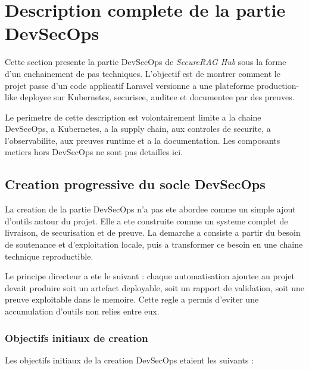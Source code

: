 % 
%

\section{Description complete de la partie DevSecOps}
\label{sec:devsecops-diagrammes-pas-a-pas}

Cette section presente la partie DevSecOps de \textit{SecureRAG Hub} sous la
forme d'un enchainement de pas techniques. L'objectif est de montrer comment le
projet passe d'un code applicatif Laravel versionne a une plateforme
production-like deployee sur Kubernetes, securisee, auditee et documentee par
des preuves.

Le perimetre de cette description est volontairement limite a la chaine
DevSecOps, a Kubernetes, a la supply chain, aux controles de securite, a
l'observabilite, aux preuves runtime et a la documentation. Les composants
metiers hors DevSecOps ne sont pas detailles ici.

\subsection{Creation progressive du socle DevSecOps}
\label{subsec:creation-socle-devsecops}

La creation de la partie DevSecOps n'a pas ete abordee comme un simple ajout
d'outils autour du projet. Elle a ete construite comme un systeme complet de
livraison, de securisation et de preuve. La demarche a consiste a partir du
besoin de soutenance et d'exploitation locale, puis a transformer ce besoin en
une chaine technique reproductible.

Le principe directeur a ete le suivant : chaque automatisation ajoutee au
projet devait produire soit un artefact deployable, soit un rapport de
validation, soit une preuve exploitable dans le memoire. Cette regle a permis
d'eviter une accumulation d'outils non relies entre eux.

\subsubsection{Objectifs initiaux de creation}

Les objectifs initiaux de la creation DevSecOps etaient les suivants :

